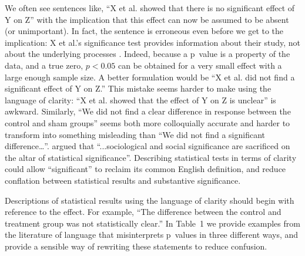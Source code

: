 We often see sentences like, ``X et al. showed that there is no significant effect of Y on Z'' with the implication that this effect can now be assumed to be absent (or unimportant). In fact, the sentence is erroneous even before we get to the implication: X et al.'s significance test provides information about their study, not about the underlying processes \citep{HoenigandHeisey2001}. Indeed, because a p~value is a property of the data, and a true zero, $p < 0.05$ can be obtained for a very small effect with a large enough sample size. A better formulation would be ``X et al. did not find a significant effect of Y on Z.'' This mistake seems harder to make using the language of clarity:  ``X et al. showed that the effect of Y on Z is unclear'' is awkward. Similarly, ``We did not find a clear difference in response between the control and sham groups'' seems both more colloquially accurate and harder to transform into something misleading than ``We did not find a significant difference\ldots''. \citet{Bernardietal.2017} argued that ``...sociological and social significance are sacrificed on the altar of statistical significance''. Describing statistical tests in terms of clarity could allow ``significant'' to reclaim its common English definition, and reduce conflation between statistical results and substantive significance.

Descriptions of statistical results using the language of clarity should begin with reference to the effect. For example, ``The difference between the control and treatment group was not statistically clear.'' In Table~1 we provide examples from the literature of language that misinterprets p~values in three different ways, and provide a sensible way of rewriting these statements to reduce confusion.

